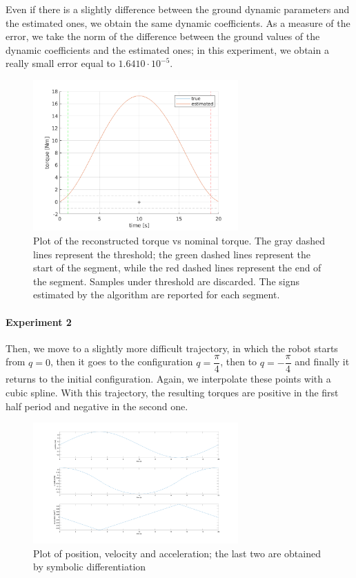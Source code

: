 \documentclass{article}
\begin{document}
Even if there is a slightly difference between the ground dynamic parameters and the estimated ones, we obtain the same dynamic coefficients. As a measure of the error, we take the norm of the difference between the ground values of the dynamic coefficients and the estimated ones; in this experiment, we obtain a really small error equal to $1.6410\cdot10^{-5}$.

\begin{figure}[!htbp]
\centering
\includegraphics[width=0.7\textwidth]{images/1-dof/results1.png}
\caption{Plot of the reconstructed torque vs nominal torque. The gray dashed lines represent the threshold; the green dashed lines represent the start of the segment, while the red dashed lines represent the end of the segment. Samples under threshold are discarded. The signs estimated by the algorithm are reported for each segment.}
\end{figure}
\FloatBarrier

\paragraph{Experiment 2}Then, we move to a slightly more difficult trajectory, in which the robot starts from $q = 0$, then it goes to the configuration $q = \dfrac{\pi}{4}$, then to $q = -\dfrac{\pi}{4}$ and finally it returns to the initial configuration. Again, we interpolate these points with a cubic spline. With this trajectory, the resulting torques are positive in the first half period and negative in the second one.

\begin{figure}[!htbp]
\centering
\includegraphics[width=0.7\textwidth]{images/1-dof/trajectory_easy2.png}
\caption{Plot of position, velocity and acceleration; the last two are obtained by symbolic differentiation}
\end{figure}
\FloatBarrier
\end{document}
